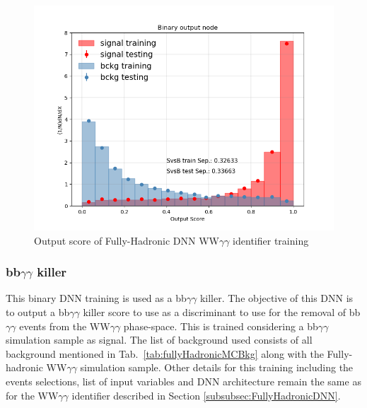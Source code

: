 \begin{figure}[!htbp]
  \centering
  \includegraphics[scale=0.6]{Sections/HHWWgg/images/FH_DNN/WWgg/overfitting_plot_BinaryClassifier_Binary.png}%
  \caption{Output score of Fully-Hadronic DNN WW$\gamma \gamma$ identifier training}
  \label{fig:FH_DNN_OutputScore}
\end{figure}

\subsubsection{bb$\gamma\gamma$ killer}

This binary DNN training is used as a bb$\gamma\gamma$ killer. The objective of this DNN is to output a bb$\gamma\gamma$ killer score to use as a discriminant to use for the removal of bb$\gamma\gamma$ events from the WW$\gamma\gamma$ phase-space. This is trained considering a bb$\gamma\gamma$ simulation sample as signal. The list of background used consists of all background mentioned in Tab.~\ref{tab:fullyHadronicMCBkg} along with the Fully-hadronic WW$\gamma\gamma$ simulation sample. Other details for this training including the events selections, list of input variables and DNN architecture remain the same as for the WW$\gamma\gamma$ identifier described in Section \ref{subsubsec:FullyHadronicDNN}. 


